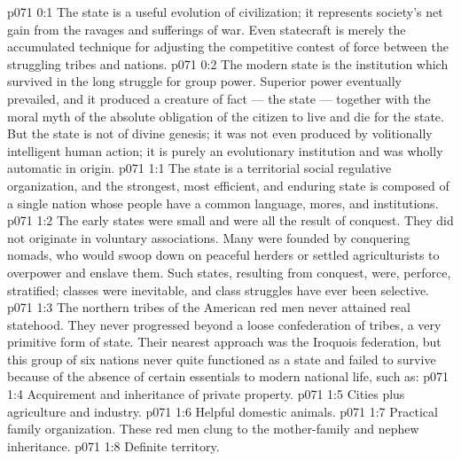 \author{Melchizedek}
\vs p071 0:1 The state is a useful evolution of civilization; it represents society’s net gain from the ravages and sufferings of war. Even statecraft is merely the accumulated technique for adjusting the competitive contest of force between the struggling tribes and nations.
\vs p071 0:2 The modern state is the institution which survived in the long struggle for group power. Superior power eventually prevailed, and it produced a creature of fact --- the state --- together with the moral myth of the absolute obligation of the citizen to live and die for the state. But the state is not of divine genesis; it was not even produced by volitionally intelligent human action; it is purely an evolutionary institution and was wholly automatic in origin.
\vs p071 1:1 The state is a territorial social regulative organization, and the strongest, most efficient, and enduring state is composed of a single nation whose people have a common language, mores, and institutions.
\vs p071 1:2 The early states were small and were all the result of conquest. They did not originate in voluntary associations. Many were founded by conquering nomads, who would swoop down on peaceful herders or settled agriculturists to overpower and enslave them. Such states, resulting from conquest, were, perforce, stratified; classes were inevitable, and class struggles have ever been selective.
\vs p071 1:3 \pc The northern tribes of the American red men never attained real statehood. They never progressed beyond a loose confederation of tribes, a very primitive form of state. Their nearest approach was the Iroquois federation, but this group of six nations never quite functioned as a state and failed to survive because of the absence of certain essentials to modern national life, such as:
\vs p071 1:4 \bibnobreakspace Acquirement and inheritance of private property.
\vs p071 1:5 \bibnobreakspace Cities plus agriculture and industry.
\vs p071 1:6 \bibnobreakspace Helpful domestic animals.
\vs p071 1:7 \bibnobreakspace Practical family organization. These red men clung to the mother\hyp{}family and nephew inheritance.
\vs p071 1:8 \bibnobreakspace Definite territory.
